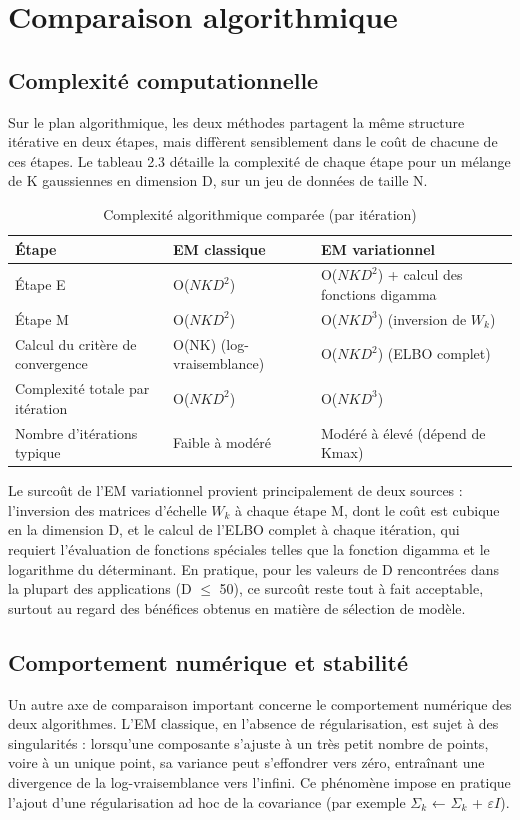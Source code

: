 \section{Comparaison algorithmique}
\subsection{Complexité computationnelle}
Sur le plan algorithmique, les deux méthodes partagent la même structure itérative en deux étapes, mais diffèrent sensiblement dans le coût de chacune de ces étapes. Le tableau 2.3 détaille la complexité de chaque étape pour un mélange de K gaussiennes en dimension D, sur un jeu de données de taille N.

\begin{table}[H]
\centering
\small
\setlength{\tabcolsep}{0.14cm}
\begin{tabular}{|p{4.84cm}|p{4.84cm}|p{4.84cm}|}
\hline
\textbf{Étape} & \textbf{EM classique} & \textbf{EM variationnel} \\
\hline
Étape E & O($NKD^{2}$) & O($NKD^{2}$) + calcul des fonctions digamma \\
\hline
Étape M & O($NKD^{2}$) & O($NKD^{3}$) (inversion de $W_{k}$) \\
\hline
Calcul du critère de convergence & O(NK) (log-vraisemblance) & O($NKD^{2}$) (ELBO complet) \\
\hline
Complexité totale par itération & O($NKD^{2}$) & O($NKD^{3}$) \\
\hline
Nombre d'itérations typique & Faible à modéré & Modéré à élevé (dépend de Kmax) \\
\hline
\end{tabular}
\caption{Complexité algorithmique comparée (par itération)}
\label{tab:2_3}
\end{table}
Le surcoût de l'EM variationnel provient principalement de deux sources : l'inversion des matrices d'échelle $W_{k}$ à chaque étape M, dont le coût est cubique en la dimension D, et le calcul de l'ELBO complet à chaque itération, qui requiert l'évaluation de fonctions spéciales telles que la fonction digamma et le logarithme du déterminant. En pratique, pour les valeurs de D rencontrées dans la plupart des applications (D $\leq $ 50), ce surcoût reste tout à fait acceptable, surtout au regard des bénéfices obtenus en matière de sélection de modèle.

\subsection{Comportement numérique et stabilité}
Un autre axe de comparaison important concerne le comportement numérique des deux algorithmes. L'EM classique, en l'absence de régularisation, est sujet à des singularités : lorsqu'une composante s'ajuste à un très petit nombre de points, voire à un unique point, sa variance peut s'effondrer vers zéro, entraînant une divergence de la log-vraisemblance vers l'infini. Ce phénomène impose en pratique l'ajout d'une régularisation ad hoc de la covariance (par exemple $\Sigma _{k}$ ← $\Sigma _{k}$ + $\varepsilon I$).

